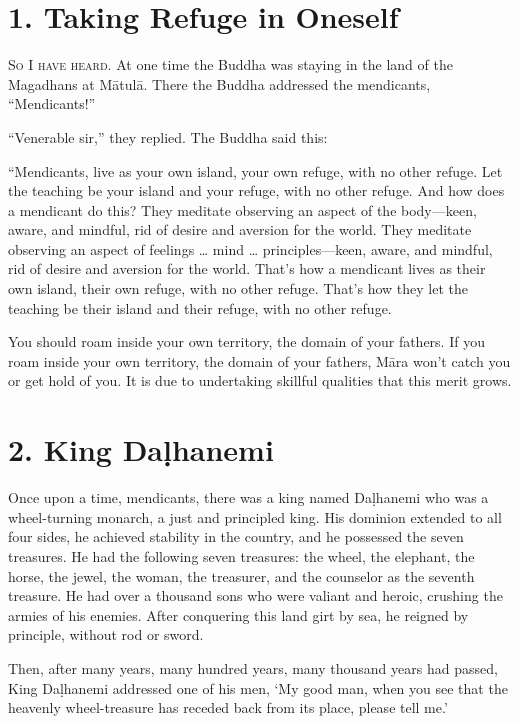\documentclass[12pt,openany]{book}%
\newcommand*{\scevam}[1]{\textsc{#1}}
\begin{document}
\section*{1. Taking Refuge in Oneself }

\scevam{So I have heard. }At one time the Buddha was staying in the land of the Magadhans at \textsanskrit{Mātulā}. There the Buddha addressed the mendicants, “Mendicants!” 

“Venerable sir,” they replied. The Buddha said this: 

“Mendicants, live as your own island, your own refuge, with no other refuge. Let the teaching be your island and your refuge, with no other refuge. And how does a mendicant do this? They meditate observing an aspect of the body—keen, aware, and mindful, rid of desire and aversion for the world. They meditate observing an aspect of feelings … mind … principles—keen, aware, and mindful, rid of desire and aversion for the world. That’s how a mendicant lives as their own island, their own refuge, with no other refuge. That’s how they let the teaching be their island and their refuge, with no other refuge. 

You should roam inside your own territory, the domain of your fathers. If you roam inside your own territory, the domain of your fathers, \textsanskrit{Māra} won’t catch you or get hold of you. It is due to undertaking skillful qualities that this merit grows. 

\section*{2. King \textsanskrit{Daḷhanemi} }

Once upon a time, mendicants, there was a king named \textsanskrit{Daḷhanemi} who was a wheel-turning monarch, a just and principled king. His dominion extended to all four sides, he achieved stability in the country, and he possessed the seven treasures. He had the following seven treasures: the wheel, the elephant, the horse, the jewel, the woman, the treasurer, and the counselor as the seventh treasure. He had over a thousand sons who were valiant and heroic, crushing the armies of his enemies. After conquering this land girt by sea, he reigned by principle, without rod or sword. 

Then, after many years, many hundred years, many thousand years had passed, King \textsanskrit{Daḷhanemi} addressed one of his men, ‘My good man, when you see that the heavenly wheel-treasure has receded back from its place, please tell me.’ 
\end{document}
